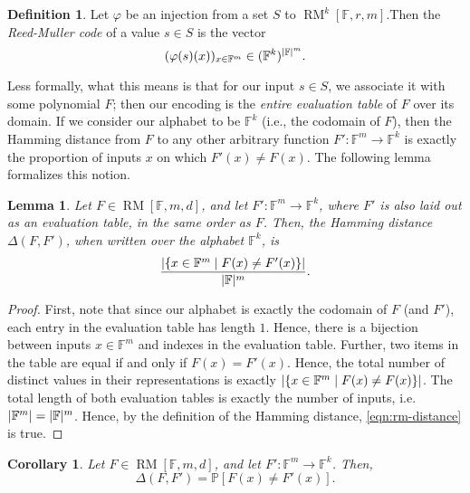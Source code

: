 \documentclass[english,12pt]{reedthesis}
\theoremstyle{plain}
\newtheorem{lemma}[lemma]{Lemma}
\newtheorem{cor}[cor]{Corollary}
\theoremstyle{definition}
\newtheorem{defn}[defn]{Definition}
\theoremstyle{remark}
\DeclareMathOperator{\RM}{RM}
\DeclarePairedDelimiter{\abs}{\lvert}{\rvert}
\begin{document}
\begin{defn}\label{def:rm-code}
  Let $\varphi$ be an injection from a set $S$ to $\RM^{k}[\mathbb{F}, r, m]$.Then the
  \emph{Reed-Muller code} of a value $s \in S$ is the vector
  \begin{equation}
    (\varphi(s)(x))_{x \in \mathbb{F}^{m}} \in (\mathbb{F}^{k})^{\abs{\mathbb{F}}^{m}}.
  \end{equation}
\end{defn}

Less formally, what this means is that for our input $s \in S$, we associate it
with some polynomial $F$; then our encoding is the \emph{entire evaluation
  table} of $F$ over its domain. If we consider our alphabet to be
$\mathbb{F}^{k}$ (i.e., the codomain of $F$), then the Hamming distance from $F$
to any other arbitrary function $F'\colon \mathbb{F}^{m} \rightarrow \mathbb{F}^{k}$ is exactly
the proportion of inputs $x$ on which $F'(x) \ne F(x)$. The following lemma
formalizes this notion.

\begin{lemma}\label{lem:rm-distance}
  Let $F \in \RM[\mathbb{F}, m, d]$, and let
  $F'\colon \mathbb{F}^{m} \rightarrow \mathbb{F}^{k}$, where $F'$ is also laid out as an
  evaluation table, in the same order as $F$. Then, the Hamming distance
  $\Delta(F, F')$, when written over the alphabet $\mathbb{F}^{k}$, is
  \begin{equation}\label{eqn:rm-distance}
    \frac{\abs*{\{x \in \mathbb{F}^{m} \mid F(x) \ne F'(x)\}}}{\abs{\mathbb{F}}^{m}}.
  \end{equation}
\end{lemma}

\begin{proof}
  First, note that since our alphabet is exactly the codomain of $F$ (and $F'$),
  each entry in the evaluation table has length $1$. Hence, there is a bijection
  between inputs $x \in \mathbb{F}^{m}$ and indexes in the evaluation table.
  Further, two items in the table are equal if and only if $F(x) = F'(x)$.
  Hence, the total number of distinct values in their representations is exactly
  $\abs{\{x \in \mathbb{F}^{m} \mid F(x) \ne F(x)\}}$. The total length of both
  evaluation tables is exactly the number of inputs, i.e.
  $\abs{\mathbb{F}^{m}} = \abs{\mathbb{F}}^{m}$. Hence, by the definition of the
  Hamming distance, \cref{eqn:rm-distance} is true.
\end{proof}

\begin{cor}\label{cor:rm-probability}
  Let $F \in \RM[\mathbb{F}, m, d]$, and let
  $F'\colon \mathbb{F}^{m} \rightarrow \mathbb{F}^{k}$. Then,
  \begin{equation}\label{eqn:rm-probability}
    \Delta(F, F') = \mathbb{P}[F(x) \ne F'(x)].
  \end{equation}
\end{cor}
\end{document}
